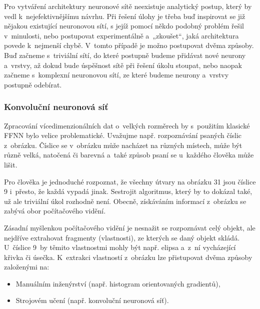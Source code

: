 \documentclass[a4paper,12pt]{article}
\begin{document}
{{{{

Pro vytváření architektury neuronové sítě neexistuje analytický postup, který by vedl k~nejefektivnějšímu návrhu. Při řešení úlohy je třeba buď inspirovat se již nějakou existující neuronovou sítí, s jejíž pomocí někdo podobný problém řešil v~minulosti, nebo postupovat experimentálně a~„zkoušet“, jaká architektura povede k~nejmenší chybě. V~tomto případě je možno postupovat dvěma způsoby. Buď začneme s~triviální sítí, do které postupně budeme přidávat nové neurony a~vrstvy, až dokud bude úspěšnost sítě při řešení úkolu stoupat, nebo naopak začneme s~komplexní neuronovou sítí, ze které budeme neurony a~vrstvy postupně odebírat.~\cite{nn}

\vspace{-5pt}

\subsubsection{Konvoluční neuronová síť}


\vspace{-5pt}

Zpracování vícedimenzionálních dat o~velkých rozměrech by s~použitím klasické FFNN bylo velice problematické. Uvažujme např. rozpoznávání psaných číslic z~obrázku. Číslice se v~obrázku může nacházet na různých místech, může být různě velká, natočená či barevná a~také způsob psaní se u~každého člověka může lišit.


\vspace{-10pt}

Pro člověka je jednoduché rozpoznat, že všechny útvary na obrázku 31 jsou číslice 9 i~přesto, že každá vypadá jinak. Sestrojit algoritmus, který by to dokázal také, už ale triviální úkol rozhodně není. Obecně, získáváním informací z~obrázku se zabývá obor počítačového vidění.~\cite{convnn}

Zásadní myšlenkou počítačového vidění je nesnažit se rozpoznávat celý objekt, ale nejdříve extrahovat fragmenty (vlastnosti), ze kterých se daný objekt skládá. U~číslice 9~by těmito vlastnostmi mohly být např. elipsa a~z~ní vycházející křivka či úsečka. K~extrakci vlastností z~obrázku lze přistupovat dvěma způsoby založenými na:

\begin{itemize}
\item Manuálním inženýrství (např. histogram orientovaných gradientů),
\item Strojovém učení (např. konvoluční neuronová síť).~\cite{convnn}
\end{itemize}

}}}}
\end{document}
